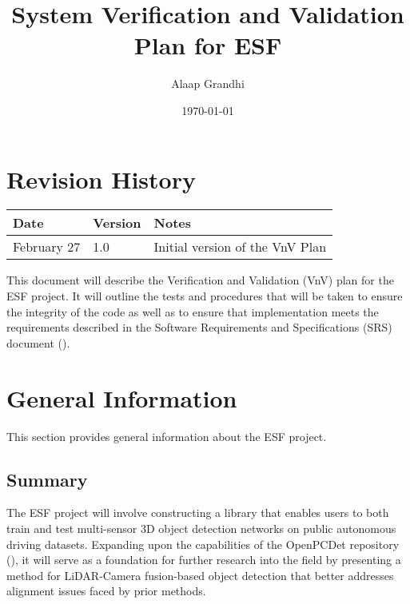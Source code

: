 \documentclass[12pt, titlepage]{article}
\newcommand{\ProjectName}{ESF }
\begin{document}
\title{System Verification and Validation Plan for \ProjectName{}} 
\author{Alaap Grandhi}
\date{\today}
	
\maketitle


\section*{Revision History}

\begin{tabularx}{\textwidth}{p{3cm}p{2cm}X}
\toprule {\bf Date} & {\bf Version} & {\bf Notes}\\
\midrule
February 27 & 1.0 & Initial version of the VnV Plan\\
\bottomrule
\end{tabularx}

\newpage

\tableofcontents

\listoftables

\newpage


This document will describe the Verification and Validation (VnV) plan for the \ProjectName{}project. It will
outline the tests and procedures that will be taken to ensure the integrity of the code as well as to ensure that
implementation meets the requirements described in the Software Requirements and Specifications (SRS) document (\cite{SRS}).
\section{General Information}
This section provides general information about the \ProjectName{}project.
\subsection{Summary}

The \ProjectName{}project will involve constructing a library that enables users to both
train and test multi-sensor 3D object detection networks on public autonomous driving datasets. 
Expanding upon the capabilities of the OpenPCDet repository (\cite{openpcdet2020}), it will serve as a foundation for 
further research into the field by presenting a method for LiDAR-Camera fusion-based object 
detection that better addresses alignment issues faced by prior methods. 
\end{document}
